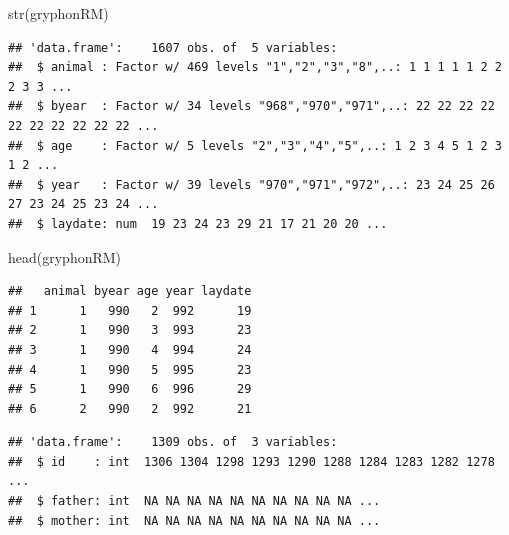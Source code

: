 \documentclass[
  12pt,
]{book}
\newenvironment{Shaded}{\begin{snugshade}}{\end{snugshade}}
\newcommand{\FunctionTok}[1]{\textcolor[rgb]{0.00,0.00,0.00}{#1}}
\newcommand{\NormalTok}[1]{#1}
\newcommand{\OtherTok}[1]{\textcolor[rgb]{0.56,0.35,0.01}{#1}}
\newcommand{\SpecialCharTok}[1]{\textcolor[rgb]{0.00,0.00,0.00}{#1}}
\begin{document}
\begin{Shaded}
\begin{Highlighting}[]
\FunctionTok{str}\NormalTok{(gryphonRM)}
\end{Highlighting}
\end{Shaded}

\begin{verbatim}
## 'data.frame':    1607 obs. of  5 variables:
##  $ animal : Factor w/ 469 levels "1","2","3","8",..: 1 1 1 1 1 2 2 2 3 3 ...
##  $ byear  : Factor w/ 34 levels "968","970","971",..: 22 22 22 22 22 22 22 22 22 22 ...
##  $ age    : Factor w/ 5 levels "2","3","4","5",..: 1 2 3 4 5 1 2 3 1 2 ...
##  $ year   : Factor w/ 39 levels "970","971","972",..: 23 24 25 26 27 23 24 25 23 24 ...
##  $ laydate: num  19 23 24 23 29 21 17 21 20 20 ...
\end{verbatim}

\begin{Shaded}
\begin{Highlighting}[]
\FunctionTok{head}\NormalTok{(gryphonRM)}
\end{Highlighting}
\end{Shaded}

\begin{verbatim}
##   animal byear age year laydate
## 1      1   990   2  992      19
## 2      1   990   3  993      23
## 3      1   990   4  994      24
## 4      1   990   5  995      23
## 5      1   990   6  996      29
## 6      2   990   2  992      21
\end{verbatim}

\begin{verbatim}
## 'data.frame':    1309 obs. of  3 variables:
##  $ id    : int  1306 1304 1298 1293 1290 1288 1284 1283 1282 1278 ...
##  $ father: int  NA NA NA NA NA NA NA NA NA NA ...
##  $ mother: int  NA NA NA NA NA NA NA NA NA NA ...
\end{verbatim}

\begin{Shaded}
\end{Shaded}
\end{document}
